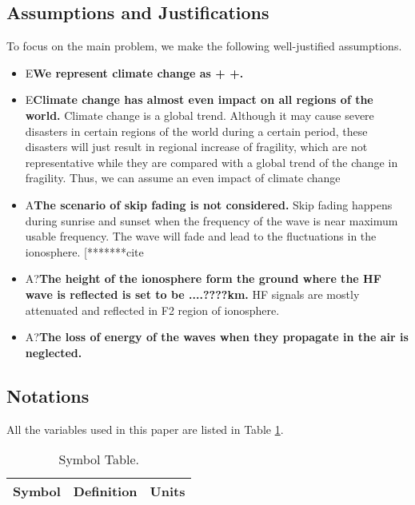\documentclass[a4paper]{article}
\begin{document}
	\subsection{Assumptions and Justifications}
    To focus on the main problem, we make the following well-justified assumptions.
    \begin{itemize}
    \item 
    E\textbf{We represent climate change as + +.}
    \item
    E\textbf{Climate change has almost even impact on all regions of the world.} Climate change is a global trend. Although it may cause severe disasters in certain regions of the world during a certain period, these disasters will just result in regional increase of fragility, which are not representative while they are compared with a global trend of the change in fragility. Thus, we can assume an even impact of climate change
    \end{itemize}
	
	\begin{itemize}
    \item
    A\textbf{The scenario of skip fading is not considered.} Skip fading happens during sunrise and sunset when the frequency of the wave is near maximum usable frequency. The wave will fade and lead to the fluctuations in the ionosphere. [*******cite %
    \item
    A?\textbf{The height of the ionosphere form the ground where the HF wave is reflected is set to be ....????km.} HF signals are mostly attenuated and reflected in F2 region of ionosphere.
    \item
    A?\textbf{The loss of energy of the waves when they propagate in the air is neglected.}
    \end{itemize}



	\subsection{Notations}
    All the variables used in this paper are listed in Table \ref{t1}.

    \begin{table}[H]
    \centering
    \begin{tabular}{lll}
    \toprule
		Symbol & Definition & Units \\
		\midrule
    \bottomrule
    \end{tabular}
    \caption{Symbol Table.}
    \label{t1}
    \end{table}
\end{document}
